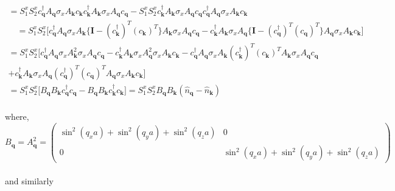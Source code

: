 \documentclass{article}
\begin{document}
\begin{multline}
[S_1^x c_{\textbf{q}}^\dagger A_{\textbf{q}} \sigma_x A_{\textbf{k}} c_\textbf{k},  S_2^xc_{\textbf{k}}^\dagger A_{\textbf{k}} \sigma_x A_{\textbf{q}} c_\textbf{q}] =  S_1^xS_2^xc_{\textbf{q}}^\dagger A_{\textbf{q}} \sigma_x A_{\textbf{k}} c_\textbf{k}c_{\textbf{k}}^\dagger A_{\textbf{k}} \sigma_x A_{\textbf{q}} c_\textbf{q}  - S_1^xS_2^x c_{\textbf{k}}^\dagger A_{\textbf{k}} \sigma_x A_{\textbf{q}} c_\textbf{q}  c_{\textbf{q}}^\dagger A_{\textbf{q}} \sigma_x A_{\textbf{k}} c_\textbf{k}\\
\quad
= S_1^xS_2^x \Big[c_{\textbf{q}}^\dagger A_{\textbf{q}} \sigma_x A_{\textbf{k}}\big\{\textbf{I} - (c_{\textbf{k}}^\dagger)^T(c_\textbf{k})^T \big\} A_{\textbf{k}} \sigma_x A_{\textbf{q}} c_\textbf{q}  -  c_{\textbf{k}}^\dagger A_{\textbf{k}} \sigma_x A_{\textbf{q}}\big\{\textbf{I} - (c_{\textbf{q}}^\dagger)^T(c_\textbf{q})^T \big\} A_{\textbf{q}} \sigma_x A_{\textbf{k}} c_\textbf{k}\Big]\\
= S_1^xS_2^x \Big[ c_{\textbf{q}}^\dagger A_{\textbf{q}} \sigma_x A_{\textbf{k}}^2   \sigma_x A_{\textbf{q}} c_\textbf{q} -  c_{\textbf{k}}^\dagger A_{\textbf{k}} \sigma_x A_{\textbf{q}}^2   \sigma_x A_{\textbf{k}} c_\textbf{k} - c_{\textbf{q}}^\dagger A_{\textbf{q}} \sigma_x A_{\textbf{k}} (c_{\textbf{k}}^\dagger)^T(c_\textbf{k})^T A_{\textbf{k}} \sigma_x A_{\textbf{q}} c_\textbf{q}\\
 +  c_{\textbf{k}}^\dagger A_{\textbf{k}} \sigma_x A_{\textbf{q}}(c_{\textbf{q}}^\dagger)^T(c_\textbf{q})^T A_{\textbf{q}} \sigma_x A_{\textbf{k}} c_\textbf{k} \Big]\\
= S_1^xS_2^x \Big[B_\textbf{q}B_\textbf{k} c_{\textbf{q}}^\dagger c_{\textbf{q}} -  B_\textbf{q}B_\textbf{k} c_{\textbf{k}}^\dagger c_{\textbf{k}} \Big] = S_1^xS_2^x B_\textbf{q}B_\textbf{k}(\hat{n}_\textbf{q} - \hat{n}_\textbf{k})\quad\quad\quad\quad\quad\quad \quad\quad\quad\quad\quad\quad\quad\quad\quad
\end{multline}
\\
where, 
\\
\begin{equation}
B_\textbf{q} = A_\textbf{q}^2 = \begin{pmatrix}\sin^2(q_xa) + \sin^2(q_ya) + \sin^2(q_za) & 0 \\ 0 & \sin^2(q_xa) + \sin^2(q_ya) + \sin^2(q_za) \end{pmatrix}
\end{equation}
\\
and similarly
\\
\end{document}
